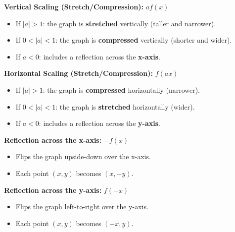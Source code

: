 	\textbf{Vertical Scaling (Stretch/Compression):} \( a f(x) \)
	      \begin{itemize}[label=\(-\)]
		      \item If \( |a| > 1 \): the graph is \textbf{stretched} vertically (taller and narrower).
		      \item If \( 0 < |a| < 1 \): the graph is \textbf{compressed} vertically (shorter and wider).
		      \item If \( a < 0 \): includes a reflection across the \textbf{x-axis}.
	      \end{itemize}

	\textbf{Horizontal Scaling (Stretch/Compression):} \( f(a x) \)
	      \begin{itemize}[label=\(-\)]
		      \item If \( |a| > 1 \): the graph is \textbf{compressed} horizontally (narrower).
		      \item If \( 0 < |a| < 1 \): the graph is \textbf{stretched} horizontally (wider).
		      \item If \( a < 0 \): includes a reflection across the \textbf{y-axis}.
	      \end{itemize}

	 \textbf{Reflection across the x-axis:} \( -f(x) \)
	      \begin{itemize}[label=\(-\)]
		      \item Flips the graph upside-down over the x-axis.
		      \item Each point \( (x, y) \) becomes \( (x, -y) \).
	      \end{itemize}

	\textbf{Reflection across the y-axis:} \( f(-x) \)
	      \begin{itemize}[label=\(-\)]
		      \item Flips the graph left-to-right over the y-axis.
		      \item Each point \( (x, y) \) becomes \( (-x, y) \).
	      \end{itemize}

\newpage